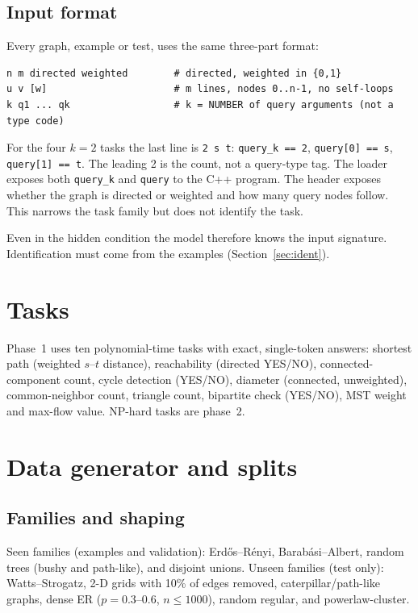 \documentclass[11pt]{article}
\begin{document}
\subsection{Input format}

Every graph, example or test, uses the same three-part format:
\begin{verbatim}
n m directed weighted        # directed, weighted in {0,1}
u v [w]                      # m lines, nodes 0..n-1, no self-loops
k q1 ... qk                  # k = NUMBER of query arguments (not a type code)
\end{verbatim}
For the four $k=2$ tasks the last line is \texttt{2 s t}: \texttt{query\_k == 2},
\texttt{query[0] == s}, \texttt{query[1] == t}. The leading 2 is the count, not
a query-type tag. The loader exposes both \texttt{query\_k} and
\texttt{query} to the C++ program.
The header exposes whether the graph is directed or weighted and how many query
nodes follow. This narrows the task family but does not identify the task.

Even in the hidden condition the model therefore knows the input signature.
Identification must come from the examples (Section~\ref{sec:ident}).

\section{Tasks}

Phase~1 uses ten polynomial-time tasks with exact, single-token answers:
shortest path (weighted $s$--$t$ distance), reachability (directed YES/NO),
connected-component count, cycle detection (YES/NO), diameter (connected,
unweighted), common-neighbor count, triangle count, bipartite check (YES/NO),
MST weight and max-flow value. NP-hard tasks are phase~2.

\begin{table}[h]
\centering
\small

\caption{Phase-1 tasks.}
\end{table}

\section{Data generator and splits}

\subsection{Families and shaping}

Seen families (examples and validation): Erd\H{o}s--R\'enyi,
Barab\'asi--Albert, random trees (bushy and path-like), and disjoint unions.
Unseen families (test only): Watts--Strogatz, 2-D grids with 10\% of edges
removed, caterpillar/path-like graphs, dense ER ($p=0.3$--$0.6$,
$n\le1000$), random regular, and powerlaw-cluster.
\end{document}
